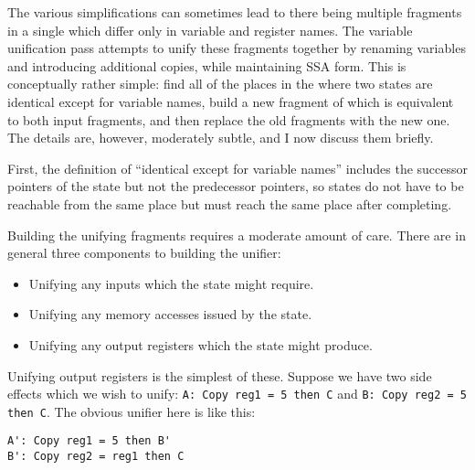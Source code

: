 
The various {\StateMachine} simplifications can sometimes lead to
there being multiple fragments in a single {\StateMachine} which differ
only in variable and register names.  The variable unification pass
attempts to unify these fragments together by renaming variables and
introducing additional copies, while maintaining SSA form.  This is
conceptually rather simple: find all of the places in the
{\StateMachine} where two states are identical except for variable
names, build a new fragment of {\StateMachine} which is equivalent to
both input fragments, and then replace the old fragments with the new
one.  The details are, however, moderately subtle, and I now discuss
them briefly.

First, the definition of ``identical except for variable names''
includes the successor pointers of the state but not the predecessor
pointers, so states do not have to be reachable from the same place
but must reach the same place after completing.

Building the unifying {\StateMachine} fragments requires a moderate
amount of care.  There are in general three components to building the
unifier:

\begin{itemize}
\item
  Unifying any inputs which the state might require.
\item
  Unifying any memory accesses issued by the state.
\item
  Unifying any output registers which the state might produce.
\end{itemize}

Unifying output registers is the simplest of these.  Suppose we have
two side effects which we wish to unify:
\verb|A: Copy reg1 = 5 then C| and \verb|B: Copy reg2 = 5 then C|.
The obvious unifier here is like this:

\begin{verbatim}
A': Copy reg1 = 5 then B'
B': Copy reg2 = reg1 then C
\end{verbatim}

